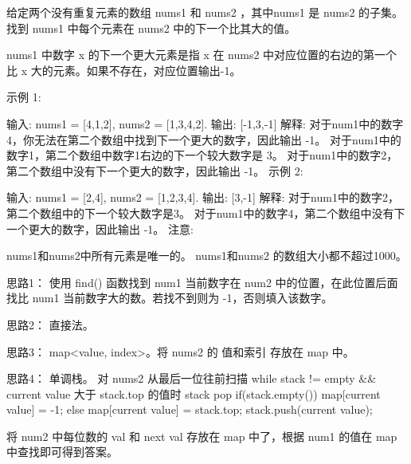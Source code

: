 给定两个没有重复元素的数组 nums1 和 nums2 ，其中nums1 是 nums2 的子集。找到 nums1 中每个元素在 nums2 中的下一个比其大的值。

nums1 中数字 x 的下一个更大元素是指 x 在 nums2 中对应位置的右边的第一个比 x 大的元素。如果不存在，对应位置输出-1。

示例 1:

输入: nums1 = [4,1,2], nums2 = [1,3,4,2].
输出: [-1,3,-1]
解释:
    对于num1中的数字4，你无法在第二个数组中找到下一个更大的数字，因此输出 -1。
    对于num1中的数字1，第二个数组中数字1右边的下一个较大数字是 3。
    对于num1中的数字2，第二个数组中没有下一个更大的数字，因此输出 -1。
示例 2:

输入: nums1 = [2,4], nums2 = [1,2,3,4].
输出: [3,-1]
解释:
    对于num1中的数字2，第二个数组中的下一个较大数字是3。
    对于num1中的数字4，第二个数组中没有下一个更大的数字，因此输出 -1。
注意:

nums1和nums2中所有元素是唯一的。
nums1和nums2 的数组大小都不超过1000。



























思路1：
使用 find() 函数找到 num1 当前数字在 num2 中的位置，在此位置后面找比 num1 当前数字大的数。若找不到则为 -1，否则填入该数字。





思路2：
直接法。




思路3： 
map<value, index>。将 nums2 的 值和索引 存放在 map 中。





思路4：
单调栈。
对 nums2 从最后一位往前扫描
while stack != empty && current value 大于 stack.top 的值时
	stack pop
if(stack.empty()) map[current value] = -1;
else map[current value] = stack.top;
stack.push(current value);

将 num2 中每位数的 val 和 next val 存放在 map 中了，根据 num1 的值在 map 中查找即可得到答案。

























